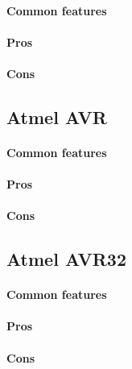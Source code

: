 \documentclass[a4paper,10pt]{article}
\begin{document}
\begin{multicols}{2}
\TODO


\paragraph{Common features}
\TODO


\paragraph{Pros}
\TODO


\paragraph{Cons}
\TODO


\subsection{Atmel AVR}

\TODO


\paragraph{Common features}
\TODO


\paragraph{Pros}
\TODO


\paragraph{Cons}
\TODO


\subsection{Atmel AVR32}

\TODO


\paragraph{Common features}
\TODO


\paragraph{Pros}
\TODO


\paragraph{Cons}
\TODO



\end{multicols}
\end{document}
